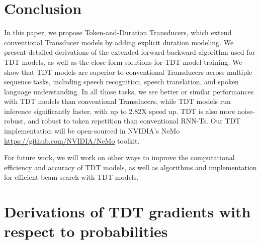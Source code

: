 \documentclass{article}
\begin{document}
\section{Conclusion}\label{future}
In this paper, we propose Token-and-Duration Transducers, which extend conventional Transducer models by adding explicit duration modeling.
We present detailed derivations of the extended forward-backward algorithm used for TDT models, as well as the close-form solutions for TDT model training. We show that TDT models are superior to conventional Transducers across multiple sequence tasks, including speech recognition, speech translation, and spoken language understanding. In all those tasks, we see better or similar performances with TDT models than conventional Transducers, while TDT models run inference significantly faster, with up to 2.82X speed up. TDT is also more noise-robust, and robust to token repetition than conventional RNN-Ts.
Our TDT implementation  will be open-sourced in NVIDIA's NeMo \url{https://github.com/NVIDIA/NeMo} toolkit.

For future work, we will work on other ways to improve the computational efficiency and accuracy of TDT models, as well as algorithms and implementation for efficient beam-search with TDT models. 





\nocite{langley00}




\newpage
\appendix
\onecolumn

\section{ Derivations of TDT gradients with respect to probabilities}
\end{document}
